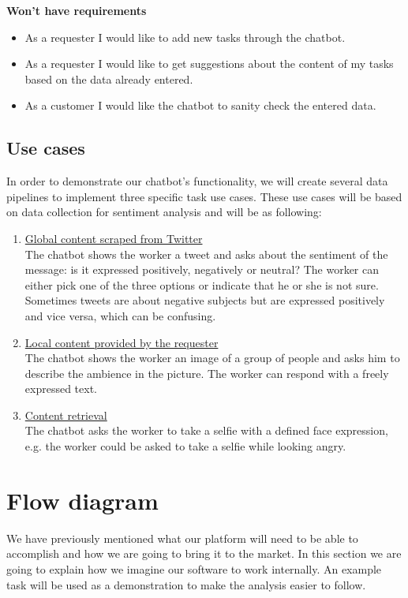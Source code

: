 \documentclass[a4paper,dutch,fleqn]{exam}
\begin{document}
\textbf{Won't have requirements} 
\begin{itemize}
\itemsep0em 
\item As a requester I would like to add new tasks through the chatbot. 
\item As a requester I would like to get suggestions about the content of my tasks based on the data already entered.
\item As a customer I would like the chatbot to sanity check the entered data.
\end{itemize}

\subsection{Use cases}
  In order to demonstrate our chatbot's functionality, we will create several data pipelines to implement three specific task use cases. These use cases will be based on data collection for sentiment analysis and will be as following:
\begin{enumerate}
\itemsep0em 
\item \underline{Global content scraped from Twitter} \\
The chatbot shows the worker a tweet and asks about the sentiment of the message: is it expressed positively, negatively or neutral? The worker can either pick one of the three options or indicate that he or she is not sure. Sometimes tweets are about negative subjects but are expressed positively and vice versa, which can be confusing. 
\item \underline{Local content provided by the requester} \\
The chatbot shows the worker an image of a group of people and asks him to describe the ambience in the picture. The worker can respond with a freely expressed text.
\item \underline{Content retrieval} \\
The chatbot asks the worker to take a selfie with a defined face expression, e.g. the worker could be asked to take a selfie while looking angry.
\end{enumerate}

\section{Flow diagram}
\label{architecture}
We have previously mentioned what our platform will need to be able to accomplish and how we are going to bring it to the market. In this section we are going to explain how we imagine our software to work internally. An example task will be used as a demonstration to make the analysis easier to follow.
\end{document}

